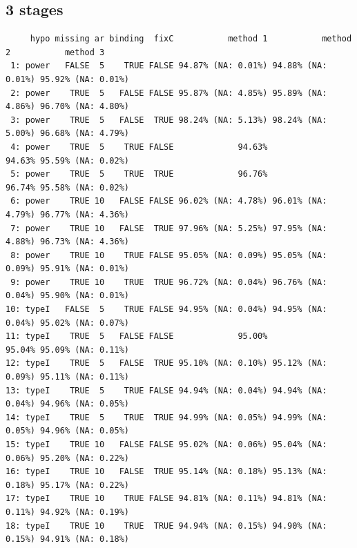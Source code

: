 \documentclass[12pt]{article}
\begin{document}
\clearpage

\subsection{3 stages}
\label{sec:org4b1c545}
\begin{verbatim}
     hypo missing ar binding  fixC           method 1           method 2           method 3
 1: power   FALSE  5    TRUE FALSE 94.87% (NA: 0.01%) 94.88% (NA: 0.01%) 95.92% (NA: 0.01%)
 2: power    TRUE  5   FALSE FALSE 95.87% (NA: 4.85%) 95.89% (NA: 4.86%) 96.70% (NA: 4.80%)
 3: power    TRUE  5   FALSE  TRUE 98.24% (NA: 5.13%) 98.24% (NA: 5.00%) 96.68% (NA: 4.79%)
 4: power    TRUE  5    TRUE FALSE             94.63%             94.63% 95.59% (NA: 0.02%)
 5: power    TRUE  5    TRUE  TRUE             96.76%             96.74% 95.58% (NA: 0.02%)
 6: power    TRUE 10   FALSE FALSE 96.02% (NA: 4.78%) 96.01% (NA: 4.79%) 96.77% (NA: 4.36%)
 7: power    TRUE 10   FALSE  TRUE 97.96% (NA: 5.25%) 97.95% (NA: 4.88%) 96.73% (NA: 4.36%)
 8: power    TRUE 10    TRUE FALSE 95.05% (NA: 0.09%) 95.05% (NA: 0.09%) 95.91% (NA: 0.01%)
 9: power    TRUE 10    TRUE  TRUE 96.72% (NA: 0.04%) 96.76% (NA: 0.04%) 95.90% (NA: 0.01%)
10: typeI   FALSE  5    TRUE FALSE 94.95% (NA: 0.04%) 94.95% (NA: 0.04%) 95.02% (NA: 0.07%)
11: typeI    TRUE  5   FALSE FALSE             95.00%             95.04% 95.09% (NA: 0.11%)
12: typeI    TRUE  5   FALSE  TRUE 95.10% (NA: 0.10%) 95.12% (NA: 0.09%) 95.11% (NA: 0.11%)
13: typeI    TRUE  5    TRUE FALSE 94.94% (NA: 0.04%) 94.94% (NA: 0.04%) 94.96% (NA: 0.05%)
14: typeI    TRUE  5    TRUE  TRUE 94.99% (NA: 0.05%) 94.99% (NA: 0.05%) 94.96% (NA: 0.05%)
15: typeI    TRUE 10   FALSE FALSE 95.02% (NA: 0.06%) 95.04% (NA: 0.06%) 95.20% (NA: 0.22%)
16: typeI    TRUE 10   FALSE  TRUE 95.14% (NA: 0.18%) 95.13% (NA: 0.18%) 95.17% (NA: 0.22%)
17: typeI    TRUE 10    TRUE FALSE 94.81% (NA: 0.11%) 94.81% (NA: 0.11%) 94.92% (NA: 0.19%)
18: typeI    TRUE 10    TRUE  TRUE 94.94% (NA: 0.15%) 94.90% (NA: 0.15%) 94.91% (NA: 0.18%)
\end{verbatim}
\end{document}

